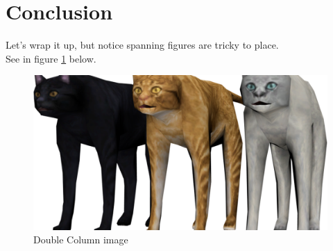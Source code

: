 \documentclass[sigconf, screen, review]{acmart}
\begin{document}
\section{Conclusion}
\par Let's wrap it up, but notice spanning figures are tricky to place.\\
See in figure \ref{fig:testtwo} below.
\begin{figure}[!htbp]
	\centering
	\includegraphics[width=0.7\linewidth]{images/example.png}
	\caption{Double Column image}
	\label{fig:testtwo}
\end{figure}



\end{document}
